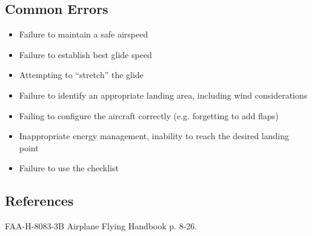 \subsection{Common Errors}

\begin{itemize}
  \item Failure to maintain a safe airspeed
  \item Failure to establish best glide speed
  \item Attempting to ``stretch'' the glide
  \item Failure to identify an appropriate landing area, including wind
    considerations
  \item Failing to configure the aircraft correctly (e.g. forgetting to add
    flaps)
  \item Inappropriate energy management, inability to reach the desired landing
    point
  \item Failure to use the checklist
\end{itemize}

\subsection{References}

FAA-H-8083-3B Airplane Flying Handbook p. 8-26.

